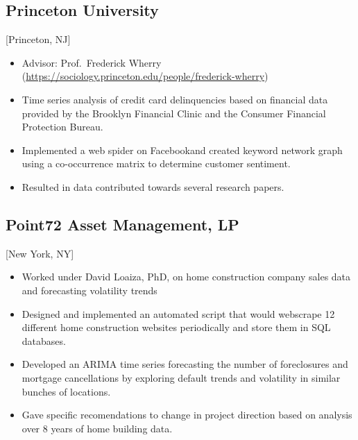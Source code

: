 \documentclass{rkim-resume}
\begin{document}
\subsection{Princeton University}[Princeton, NJ]
\begin{positions}
\end{positions}

\begin{itemize}
  \item Advisor: Prof.~Frederick Wherry (\href{https://sociology.princeton.edu/people/frederick-wherry}{https://sociology.princeton.edu/people/frederick-wherry})
  \item Time series analysis of credit card delinquencies based on financial data provided by the Brooklyn Financial Clinic and the Consumer Financial Protection Bureau.
  \item Implemented a web spider on Facebook\@ and created keyword network graph using a co-occurrence matrix to determine customer sentiment.
  \item Resulted in data contributed towards several research papers.
\end{itemize}

\subsection{Point72 Asset Management, LP}[New York, NY]
\begin{positions}
\end{positions}

\begin{itemize}
  \item Worked under David Loaiza, PhD, on home construction company sales data and forecasting volatility trends
  \item Designed and implemented an automated script that would webscrape 12 different home construction websites periodically and store them in SQL databases.
  \item Developed an ARIMA time series forecasting the number of foreclosures and mortgage cancellations by exploring default trends and volatility in similar bunches of locations.
  \item Gave specific recomendations to change in project direction based on analysis over 8 years of home building data.
\end{itemize}
\end{document}
